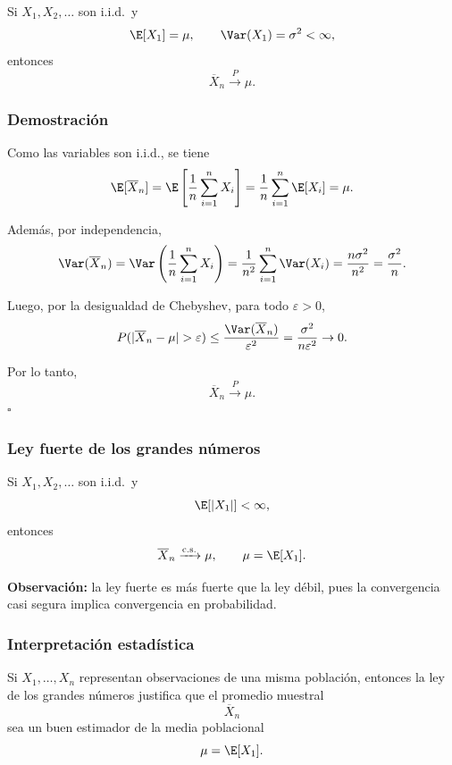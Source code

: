 \begin{teo}
Si $X_1,X_2,\dots$ son i.i.d.\ y
\[
\E[X_1]=\mu,
\qquad
\Var(X_1)=\sigma^2<\infty,
\]
entonces
\[
\overline{X}_n \xrightarrow{P} \mu.
\]
\end{teo}

\subsubsection*{Demostración}

Como las variables son i.i.d., se tiene
\[
\E[\overline{X}_n]
=
\E\left[\frac{1}{n}\sum_{i=1}^n X_i\right]
=
\frac{1}{n}\sum_{i=1}^n \E[X_i]
=
\mu.
\]

Además, por independencia,
\[
\Var(\overline{X}_n)
=
\Var\left(\frac{1}{n}\sum_{i=1}^n X_i\right)
=
\frac{1}{n^2}\sum_{i=1}^n \Var(X_i)
=
\frac{n\sigma^2}{n^2}
=
\frac{\sigma^2}{n}.
\]

Luego, por la desigualdad de Chebyshev, para todo $\varepsilon>0$,
\[
P(|\overline{X}_n-\mu|>\varepsilon)
\le
\frac{\Var(\overline{X}_n)}{\varepsilon^2}
=
\frac{\sigma^2}{n\varepsilon^2}
\to 0.
\]

Por lo tanto,
\[
\overline{X}_n \xrightarrow{P} \mu.
\]
\hfill $\square$

\subsubsection*{Ley fuerte de los grandes números}

\begin{teo}
Si $X_1,X_2,\dots$ son i.i.d.\ y
\[
\E[|X_1|]<\infty,
\]
entonces
\[
\overline{X}_n \xrightarrow{\mathrm{c.s.}} \mu,
\qquad \mu=\E[X_1].
\]
\end{teo}

\medskip

\noindent
\textbf{Observación:} la ley fuerte es más fuerte que la ley débil, pues la convergencia casi segura implica convergencia en probabilidad.

\subsubsection*{Interpretación estadística}

Si $X_1,\dots,X_n$ representan observaciones de una misma población, entonces la ley de los grandes números justifica que el promedio muestral
\[
\overline{X}_n
\]
sea un buen estimador de la media poblacional
\[
\mu=\E[X_1].
\]

